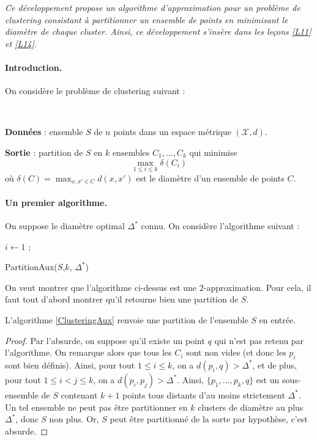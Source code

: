 

\textit{
Ce développement propose un algorithme d'approximation pour un problème de clustering consistant à partitionner un ensemble de points en minimisant le diamètre de chaque cluster. 
Ainsi, ce développement s'insère dans les leçons \ref{L11} et \ref{L14}.
}
\paragraph{Introduction.} On considère le problème de clustering suivant :

\begin{definition}~

\textbf{Données} : ensemble $S$ de $n$ points dans un espace métrique $(\mathcal{X},d)$.

\textbf{Sortie} : partition de $S$ en $k$ ensembles $C_1,...,C_k$ qui minimise 
$$
\max_{1\leq i \leq k} \delta(C_i)
$$
où $\delta(C) = \max_{x,x'\in C} d(x,x')$ est le diamètre d'un ensemble de points $C$.
\end{definition}

\paragraph{Un premier algorithme.} On suppose le diamètre optimal $\Delta^*$ connu. On considère l'algorithme suivant :

\begin{algorithm}
$i\leftarrow 1$ ;\\
\caption{PartitionAux($S$,$k$, $\Delta^*$)}\label{ClusteringAux}
\end{algorithm}


On veut montrer que l'algorithme ci-dessus est une $2$-approximation. Pour cela, il faut tout d'abord montrer qu'il retourne bien une partition de $S$.

\begin{lemma}
L'algorithme \ref{ClusteringAux} renvoie une partition de l'ensemble $S$ en entrée.
\end{lemma}

\begin{proof}
Par l'absurde, on suppose qu'il existe un point $q$ qui n'est pas retenu par l'algorithme. On remarque alors que tous les $C_i$ sont non vides (et donc les $p_i$ sont bien définis). Ainsi, pour tout $1\leq i \leq k$, on a $d(p_i,q) >\Delta^*$, et de plus, pour tout $1\leq i <j \leq k$, on a $d(p_i,p_j)>\Delta^*$. Ainsi, $\{p_1,...,p_k,q\}$ est un sous-ensemble de $S$ contenant $k+1$ points tous distants d'au moins strictement $\Delta^*$. Un tel ensemble ne peut pas être partitionner en $k$ clusters de diamètre au plus $\Delta^*$, donc $S$ non plus. Or, $S$ peut être partitionné de la sorte par hypothèse, c'est absurde.
\end{proof}

